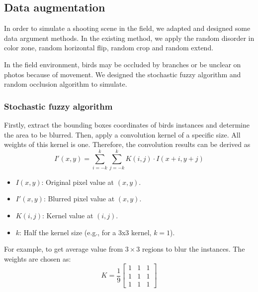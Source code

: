 \subsection{Data augmentation}
In order to simulate a shooting scene in the field, 
we adapted and designed some data argument methods. 
In the existing method, we apply the random disorder 
in color zone, random horizontal flip, 
random crop and random extend.

In the field environment, birds may be occluded by 
branches or be unclear on photos because of movement. 
We designed the stochastic fuzzy algorithm and 
random occlusion algorithm to simulate. 
\subsubsection{Stochastic fuzzy algorithm}
Firstly, extract the bounding boxes coordinates of 
birds instances and determine the area to be blurred. 
Then, apply a convolution kernel of a specific size. 
All weights of this kernel is one. Therefore, the 
convolution results can be derived as 
\[
I'(x, y) = \sum_{i=-k}^{k} \sum_{j=-k}^{k} K(i, j) \cdot I(x+i, y+j)
\]
\begin{itemize}
    \item \( I(x, y) \): Original pixel value at \((x, y)\).
    \item \( I'(x, y) \): Blurred pixel value at \((x, y)\).
    \item \( K(i, j) \): Kernel value at \((i, j)\).
    \item \( k \): Half the kernel size (e.g., for a 3x3 kernel, \( k=1 \)).
\end{itemize}
For example, to get average value from $3\times 3$ regions to blur the instances.
The weights are chosen as:
\[
K = \frac{1}{9}
\begin{bmatrix}
1 & 1 & 1 \\
1 & 1 & 1 \\
1 & 1 & 1
\end{bmatrix}
\]
